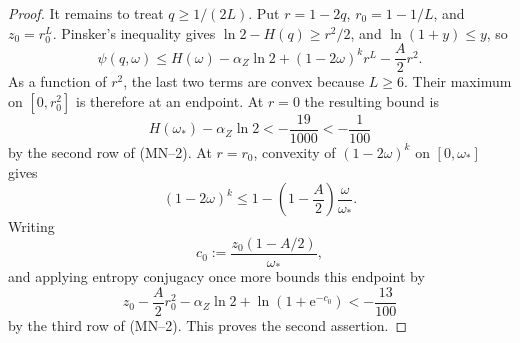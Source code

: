 \documentclass[11pt]{article}
\theoremstyle{definition}
\begin{document}
\begin{proof}
It remains to treat \(q\ge1/(2L)\).  Put
\(r=1-2q\), \(r_0=1-1/L\), and \(z_0=r_0^L\).  Pinsker's inequality gives
\(\ln2-H(q)\ge r^2/2\), and \(\ln(1+y)\le y\), so
\[
\psi(q,\omega)
\le H(\omega)-\alpha_Z\ln2
+(1-2\omega)^kr^L-\frac A2r^2.
\]
As a function of \(r^2\), the last two terms are convex because \(L\ge6\).
Their maximum on \([0,r_0^2]\) is therefore at an endpoint.  At \(r=0\)
the resulting bound is
\[
H(\omega_*)-\alpha_Z\ln2<-\frac{19}{1000}<-\frac1{100}
\]
by the second row of (MN--2).
At \(r=r_0\), convexity of \((1-2\omega)^k\) on
\([0,\omega_*]\) gives
\[
(1-2\omega)^k
\le1-\left(1-\frac A2\right)\frac\omega{\omega_*}.
\]
Writing
\[
c_0:=\frac{z_0(1-A/2)}{\omega_*},
\]
and applying entropy conjugacy once more bounds this endpoint by
\[
z_0-\frac A2r_0^2-\alpha_Z\ln2+\ln(1+\mathrm e^{-c_0})
<-\frac{13}{100}
\]
by the third row of (MN--2).
This proves the second assertion.
\end{proof}
\end{document}
